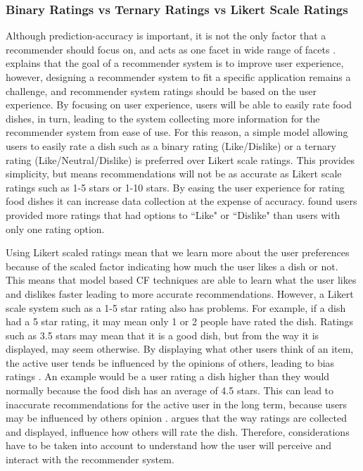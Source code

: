 \subsubsection{Binary Ratings vs Ternary Ratings vs Likert Scale Ratings}

Although prediction-accuracy is important, it is not the only factor that a recommender should focus on, and acts as one facet in wide range of facets \cite{martin2009recsys}. \citeauthor{martin2009recsys} \cite{martin2009recsys} explains that the goal of a recommender system is to improve user experience, however, designing a recommender system to fit a specific application remains a challenge, and recommender system ratings should be based on the user experience. By focusing on user experience, users will be able to easily rate food dishes, in turn, leading to the system collecting more information for the recommender system from ease of use. For this reason, a simple model allowing users to easily rate a dish such as a binary rating (Like/Dislike) or a ternary rating (Like/Neutral/Dislike) is preferred over Likert scale ratings. This provides simplicity, but means recommendations will not be as accurate as Likert scale ratings such as 1-5 stars or 1-10 stars. By easing the user experience for rating food dishes it can increase data collection at the expense of accuracy. \citeauthor{movieratings} \cite{schafer2007collaborative, moveratings} found users provided more ratings that had options to ``Like" or ``Dislike" than users with only one rating option. 

Using Likert scaled ratings mean that we learn more about the user preferences because of the scaled factor indicating how much the user likes a dish or not. This means that model based CF techniques are able to learn what the user likes and dislikes faster leading to more accurate recommendations. However, a Likert scale system such as a 1-5 star rating also has problems. For example, if a dish had a 5 star rating, it may mean only 1 or 2 people have rated the dish. Ratings such as 3.5 stars may mean that it is a good dish, but from the way it is displayed, may seem otherwise. By displaying what other users think of an item, the active user tends be influenced by the opinions of others, leading to bias ratings \cite{interface}. An example would be a user rating a dish higher than they would normally because the food dish has an average of 4.5 stars. This can lead to inaccurate recommendations for the active user in the long term, because users may be influenced by others opinion \cite{interface}. \citeauthor{interface} \cite{interface} argues that the way ratings are collected and displayed, influence how others will rate the dish. Therefore, considerations have to be taken into account to understand how the user will perceive and interact with the recommender system.  

